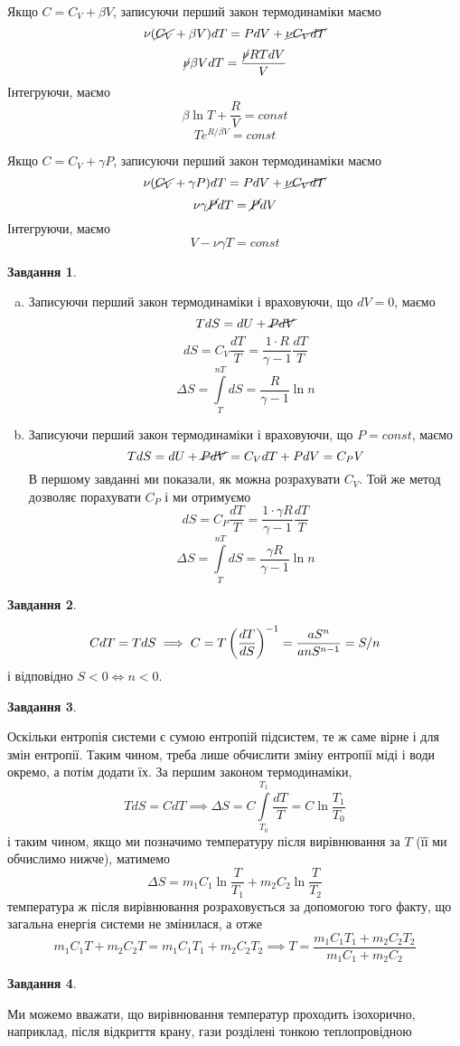\documentclass[12pt]{article} %
\newtheorem{prob}{Завдання}
\let\oldint\int
\renewcommand{\int}{\oldint\limits}
\begin{document}
	Якщо $C=C_V+\beta V$, записуючи перший закон термодинаміки маємо
	\[\nu (\cancel{C_V}+\beta V)dT=PdV+\cancel{\nu C_VdT}\]
	\[\cancel{\nu}\beta VdT=\frac{\cancel{\nu}RTdV}{V}\]
	Інтегруючи, маємо
	\[\beta\ln T+\frac{R}{V}=const\]
	\[Te^{R/\beta V}=const\]

	Якщо $C=C_V+\gamma P$, записуючи перший закон термодинаміки маємо
	\[\nu (\cancel{C_V}+\gamma P)dT=PdV+\cancel{\nu C_VdT}\]
	\[\nu\gamma \cancel{P}dT=\cancel{P}dV\]
	Інтегруючи, маємо
	\[V-\nu\gamma T=const\]
	\setcounter{prob}{0}
\begin{prob}\end{prob}%
	\begin{enumerate}[a)]
		\item Записуючи перший закон термодинаміки і враховуючи, що $dV=0$, маємо
			\[TdS=dU+\cancel{PdV}\]
			\[dS=C_V\frac{dT}{T}=\frac{1\cdot R}{\gamma-1}\frac{dT}{T}\]
			\[\Delta S=\int_T^{nT}dS=\frac{R}{\gamma-1}\ln n\]
		\item Записуючи перший закон термодинаміки і враховуючи, що $P=const$, маємо
			\[TdS=dU+\cancel{PdV}=C_VdT+PdV=C_PV\]
			В першому завданні ми показали, як можна розрахувати $C_V$. Той же метод дозволяє порахувати $C_P$ і ми отримуємо
			\[dS=C_P\frac{dT}{T}=\frac{1\cdot\gamma R}{\gamma-1}\frac{dT}{T}\]
			\[\Delta S=\int_T^{nT}dS=\frac{\gamma R}{\gamma-1}\ln n\]
	\end{enumerate}
\begin{prob}\end{prob}%
	\[CdT=TdS\implies C=T\left(\frac{dT}{dS}\right)^{-1}=\frac{aS^n}{anS^{n-1}}=S/n\]
	і відповідно $S<0\iff n<0$.
\begin{prob}\end{prob}%
	Оскільки ентропія системи є сумою ентропій підсистем, те ж саме вірне і для змін ентропії. Таким чином, треба лише обчислити
	зміну ентропії міді і води окремо, а потім додати їх. За першим законом термодинаміки,
	\[TdS=CdT\implies \Delta S=C\int_{T_0}^{T_1}\frac{dT}{T}=C\ln\frac{T_1}{T_0}\]
	і таким чином, якщо ми позначимо температуру після вирівнювання за $T$ (її ми обчислимо нижче), матимемо
	\[\Delta S=m_1C_1\ln\frac{T}{T_1}+m_2C_2\ln\frac{T}{T_2}\]
	температура ж після вирівнювання розраховується за допомогою того факту, що загальна енергія системи не змінилася, а отже
	\[m_1C_1T+m_2C_2T=m_1C_1T_1+m_2C_2T_2\implies T=\frac{m_1C_1T_1+m_2C_2T_2}{m_1C_1+m_2C_2}\]
\begin{prob}\end{prob}%
	Ми можемо вважати, що вирівнювання температур проходить ізохорично, наприклад, після відкриття крану, гази розділені тонкою теплопровідною
\end{document}
